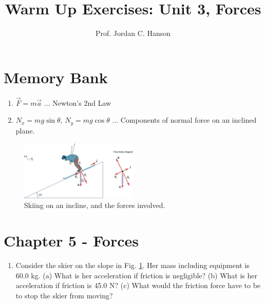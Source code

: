 \documentclass{article}
\begin{document}
\title{Warm Up Exercises: Unit 3, Forces}
\author{Prof. Jordan C. Hanson}

\maketitle

\section{Memory Bank}

\begin{enumerate}
\item $\vec{F} = m \vec{a}$ ... Newton's 2nd Law
\item $N_x = mg \sin\theta$, $N_y = mg \cos\theta$ ... Components of normal force on an inclined plane.
\end{enumerate}

\begin{figure}[ht]
\centering
\includegraphics[width=0.5\textwidth]{figures/ski.jpeg}
\caption{\label{fig:1} Skiing on an incline, and the forces involved.}
\end{figure}

\section{Chapter 5 - Forces}

\begin{enumerate}
\item Consider the skier on the slope in Fig. \ref{fig:1}. Her mass including equipment is 60.0 kg. (a) What is her acceleration if friction is negligible? (b) What is her acceleration if friction is 45.0 N? (c) What would the friction force have to be to stop the skier from moving?
\end{enumerate}
\end{document}
